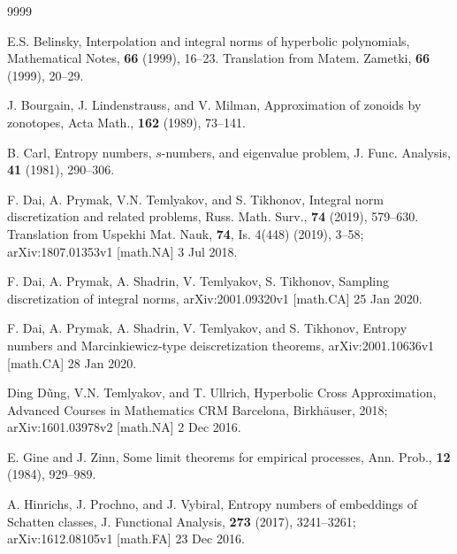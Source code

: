 \documentclass[12pt]{article}
\numberwithin{equation}{section}
\begin{document}
\begin{thebibliography}{9999}


 E.S. Belinsky, Interpolation and integral norms of hyperbolic polynomials,
Mathematical Notes, {\bf 66} (1999), 16--23. Translation from
 Matem. Zametki, {\bf 66} (1999), 20--29.

 J. Bourgain, J. Lindenstrauss, and V. Milman, Approximation of zonoids by zonotopes, Acta Math., {\bf 162} (1989), 73--141.

 B. Carl, Entropy numbers, $s$-numbers, and eigenvalue problem, J.
Func. Analysis, {\bf 41} (1981), 290--306.

 F. Dai, A. Prymak, V.N. Temlyakov, and  S. Tikhonov, Integral norm discretization and related problems,
Russ. Math. Surv., {\bf 74}  (2019), 579--630.
 Translation from
Uspekhi Mat. Nauk,  {\bf 74},	Is. 4(448) (2019),	3--58; arXiv:1807.01353v1 [math.NA] 3 Jul 2018.

F. Dai, A. Prymak, A. Shadrin, V. Temlyakov, S. Tikhonov,
Sampling discretization of integral norms,
arXiv:2001.09320v1 [math.CA] 25 Jan 2020.
 
  F. Dai, A. Prymak, A. Shadrin, V. Temlyakov, and S. Tikhonov, Entropy numbers and Marcinkiewicz-type deiscretization theorems, arXiv:2001.10636v1 [math.CA] 28 Jan 2020.


 Ding D{\~u}ng, V.N. Temlyakov, and T. Ullrich, Hyperbolic Cross Approximation, Advanced Courses in Mathematics CRM Barcelona, Birkh{\"a}user, 2018; arXiv:1601.03978v2 [math.NA] 2 Dec 2016.


 E. Gine and J. Zinn, Some limit theorems for empirical processes, 
Ann. Prob., {\bf 12} (1984), 929--989.

  A. Hinrichs, J. Prochno, and J. Vybiral, Entropy numbers of embeddings of Schatten classes, J. Functional Analysis, {\bf 273} (2017), 3241--3261; arXiv:1612.08105v1 [math.FA] 23 Dec 2016.



\end{thebibliography}
\end{document}
